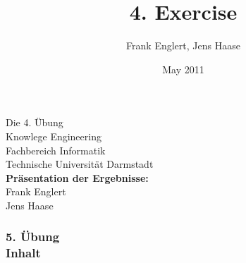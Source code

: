\documentclass[accentcolor=tud1b,colorbacktitle,inverttitle,landscape,presentation,t]{tudbeamer}
\newcommand{\myframetitle}[2]{\frametitle{#1 \\[.2cm] \small #2}}
\begin{document}
\title[MGA]{\large 4. Exercise}

\author{Frank Englert, Jens Haase}


\date{May 2011}

\begin{titleframe}
\begin{center}
\color{tudtextaccent} \large Die 4. Übung\\[.5cm]
\normalcolor \normalsize Knowlege Engineering \\
Fachbereich Informatik \\
Technische Universität Darmstadt\\[.5cm]

\textbf{Präsentation der Ergebnisse:}\\
Frank Englert\\ 
Jens Haase
\end{center}

\end{titleframe}  

\begin{frame}[c]
	\myframetitle{5. Übung}{Inhalt}

\end{frame}




\end{document}
